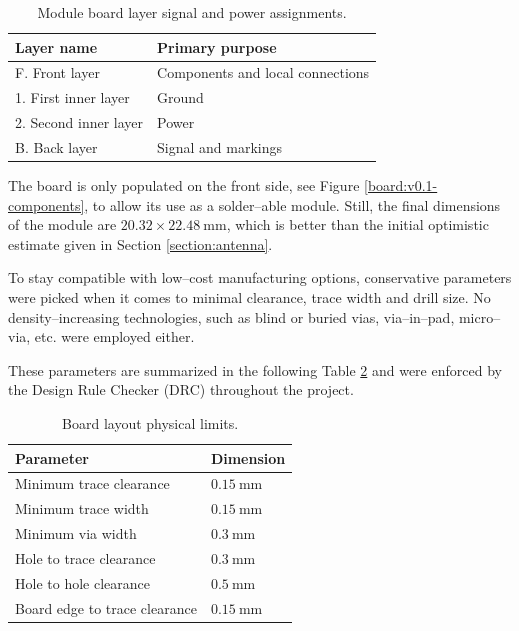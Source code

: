 \begin{table}[H]
\begin{center}
\caption{\label{table:board-layers}Module board layer signal and power assignments.}
    \begin{tabular}{|l|l|} \hline
    \textbf{Layer name}     & \textbf{Primary purpose} \\ \hline
    F. Front layer          & Components and local connections \\ \hline
    1. First inner layer    & Ground \\ \hline
    2. Second inner layer   & Power \\ \hline
    B. Back layer           & Signal and markings \\ \hline
    \end{tabular}
\end{center}
\end{table}

The board is only populated on the front side, see Figure \ref{board:v0.1-components}, to allow its use as a solder--able module. Still, the final dimensions of the module are $20.32 \times 22.48~\mathrm{mm}$, which is better than the initial optimistic estimate given in Section \ref{section:antenna}.

To stay compatible with low--cost manufacturing options, conservative parameters were picked when it comes to minimal clearance, trace width and drill size. No density--increasing technologies, such as blind or buried vias, via--in--pad, micro--via, etc. were employed either. 

These parameters are summarized in the following Table \ref{table:board-limits} and were enforced by the Design Rule Checker (DRC) throughout the project.

\begin{table}[H]
\begin{center}
\caption{\label{table:board-limits}Board layout physical limits.}
    \begin{tabular}{|l|l|} \hline
    \textbf{Parameter}          & \textbf{Dimension} \\ \hline
    Minimum trace clearance & $0.15~\mathrm{mm}$ \\ \hline
    Minimum trace width & $0.15~\mathrm{mm}$ \\ \hline
    Minimum via width & $0.3~\mathrm{mm}$ \\ \hline
    Hole to trace clearance & $0.3~\mathrm{mm}$ \\ \hline
    Hole to hole clearance & $0.5~\mathrm{mm}$ \\ \hline
    Board edge to trace clearance & $0.15~\mathrm{mm}$ \\ \hline
    \end{tabular}
\end{center}
\end{table}

